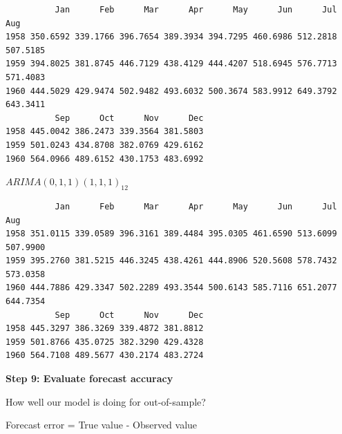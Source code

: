 \documentclass[
  11pt,
  a4paper,
]{report}
\newenvironment{Shaded}{\begin{snugshade}}{\end{snugshade}}
\newcommand{\AttributeTok}[1]{\textcolor[rgb]{0.40,0.45,0.13}{#1}}
\newcommand{\DecValTok}[1]{\textcolor[rgb]{0.68,0.00,0.00}{#1}}
\newcommand{\FunctionTok}[1]{\textcolor[rgb]{0.28,0.35,0.67}{#1}}
\newcommand{\NormalTok}[1]{\textcolor[rgb]{0.00,0.23,0.31}{#1}}
\newcommand{\OtherTok}[1]{\textcolor[rgb]{0.00,0.23,0.31}{#1}}
\newcommand{\SpecialCharTok}[1]{\textcolor[rgb]{0.37,0.37,0.37}{#1}}
\begin{document}
\begin{Shaded}
\end{Shaded}

\begin{verbatim}
          Jan      Feb      Mar      Apr      May      Jun      Jul      Aug
1958 350.6592 339.1766 396.7654 389.3934 394.7295 460.6986 512.2818 507.5185
1959 394.8025 381.8745 446.7129 438.4129 444.4207 518.6945 576.7713 571.4083
1960 444.5029 429.9474 502.9482 493.6032 500.3674 583.9912 649.3792 643.3411
          Sep      Oct      Nov      Dec
1958 445.0042 386.2473 339.3564 381.5803
1959 501.0243 434.8708 382.0769 429.6162
1960 564.0966 489.6152 430.1753 483.6992
\end{verbatim}

\(ARIMA(0,1,1)(1,1,1)_{12}\)

\begin{Shaded}
\end{Shaded}

\begin{verbatim}
          Jan      Feb      Mar      Apr      May      Jun      Jul      Aug
1958 351.0115 339.0589 396.3161 389.4484 395.0305 461.6590 513.6099 507.9900
1959 395.2760 381.5215 446.3245 438.4261 444.8906 520.5608 578.7432 573.0358
1960 444.7886 429.3347 502.2289 493.3544 500.6143 585.7116 651.2077 644.7354
          Sep      Oct      Nov      Dec
1958 445.3297 386.3269 339.4872 381.8812
1959 501.8766 435.0725 382.3290 429.4328
1960 564.7108 489.5677 430.2174 483.2724
\end{verbatim}

\textbf{Step 9: Evaluate forecast accuracy}

How well our model is doing for out-of-sample?

Forecast error = True value - Observed value
\end{document}
